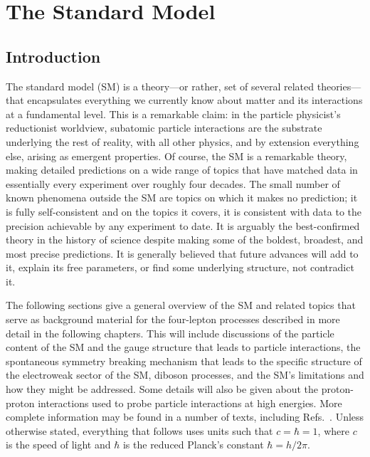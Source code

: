 

\chapter{The Standard Model}

\section{Introduction}

The standard model (SM) is a theory---or rather, set of several related theories---that encapsulates everything we currently know about matter and its interactions at a fundamental level.
This is a remarkable claim: in the particle physicist's reductionist worldview, subatomic particle interactions are the substrate underlying the rest of reality, with all other physics, and by extension everything else, arising as emergent properties.
Of course, the SM is a remarkable theory, making detailed predictions on a wide range of topics that have matched data in essentially every experiment over roughly four decades.
The small number of known phenomena outside the SM are topics on which it makes no prediction; it is fully self-consistent and on the topics it covers, it is consistent with data to the precision achievable by any experiment to date.
It is arguably the best-confirmed theory in the history of science despite making some of the boldest, broadest, and most precise predictions.
It is generally believed that future advances will add to it, explain its free parameters, or find some underlying structure, not contradict it.

The following sections give a general overview of the SM and related topics that serve as background material for the four-lepton processes described in more detail in the following chapters.
This will include discussions of the particle content of the SM and the gauge structure that leads to particle interactions, the spontaneous symmetry breaking mechanism that leads to the specific structure of the electroweak sector of the SM, diboson processes, and the SM's limitations and how they might be addressed.
Some details will also be given about the proton-proton interactions used to probe particle interactions at high energies.
More complete information may be found in a number of texts, including Refs.~\cite{Griffiths:111880,Halzen:1984mc,barger1997collider,Peskin:1995ev,Donoghue:238727}.
Unless otherwise stated, everything that follows uses units such that $c = \hbar = 1$, where $c$ is the speed of light and $\hbar$ is the reduced Planck's constant $\hbar = h / 2\pi$.



